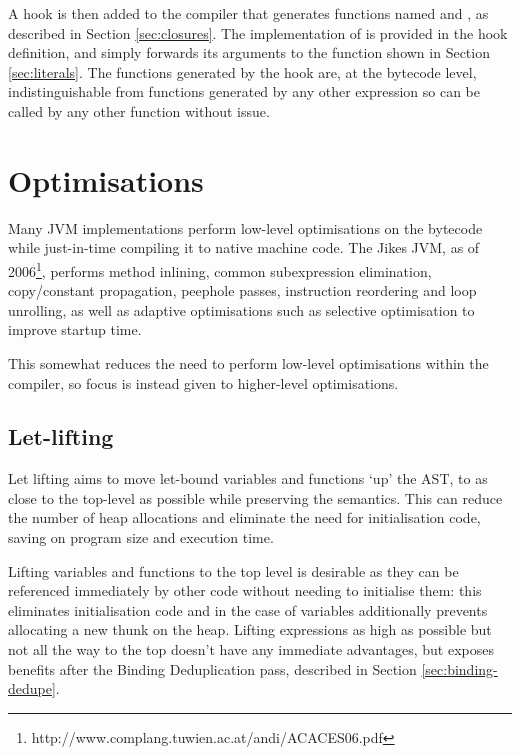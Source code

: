 \documentclass[dissertation.tex]{subfiles}
\begin{document}
{{        A hook is then added to the compiler that generates functions named  and
        , as described in Section \ref{sec:closures}. The implementation of
         is provided in the hook definition, and simply forwards its arguments to the
         function shown in Section \ref{sec:literals}. The functions generated by the hook are, at the
        bytecode level, indistinguishable from functions generated by any other expression so can be called by any
        other function without issue.

    }
}
\section{Optimisations}
{

    Many JVM implementations perform low-level optimisations on the bytecode while just-in-time compiling it to
    native machine code. The Jikes JVM, as of 2006\footnote{http://www.complang.tuwien.ac.at/andi/ACACES06.pdf},
    performs method inlining, common subexpression elimination, copy/constant propagation, peephole passes,
    instruction reordering and loop unrolling, as well as adaptive optimisations such as selective optimisation to
    improve startup time.

    This somewhat reduces the need to perform low-level optimisations within the compiler, so focus is instead given
    to higher-level optimisations.

    \subsection{Let-lifting}
    {

        Let lifting aims to move let-bound variables and functions `up' the AST, to as close to the top-level as
        possible while preserving the semantics. This can reduce the number of heap allocations and eliminate the
        need for initialisation code, saving on program size and execution time.

        
        Lifting variables and functions to the top level is desirable as they can be referenced immediately by other
        code without needing to initialise them: this eliminates initialisation code and in the case of variables
        additionally prevents allocating a new thunk on the heap. Lifting expressions as high as possible but not
        all the way to the top doesn't have any immediate advantages, but exposes benefits after the Binding
        Deduplication pass, described in Section \ref{sec:binding-dedupe}.

}}
\end{document}
